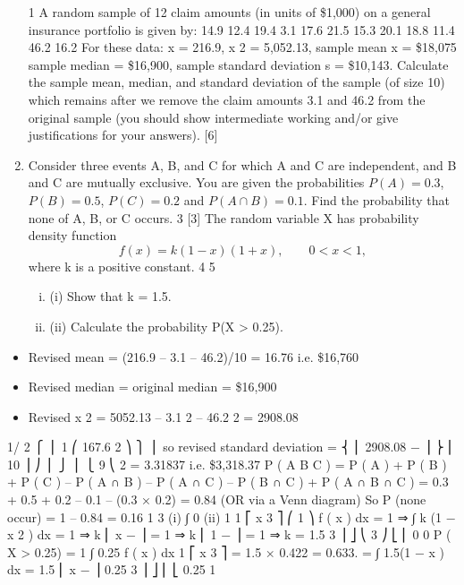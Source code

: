 \documentclass[a4paper,12pt]{article}
\begin{document}
\begin{enumerate}
1
A random sample of 12 claim amounts (in units of \$1,000) on a general insurance
portfolio is given by:
14.9
12.4
19.4
3.1
17.6
21.5
15.3
20.1
18.8
11.4
46.2
16.2
For these data: \sigma x = 216.9, \sigma x 2 = 5,052.13, sample mean x = \$18,075
sample median = \$16,900, sample standard deviation s = \$10,143.
Calculate the sample mean, median, and standard deviation of the sample (of size 10)
which remains after we remove the claim amounts 3.1 and 46.2 from the original
sample (you should show intermediate working and/or give justifications for your answers).
[6]
\item Consider three events A, B, and C for which A and C are independent, and B and C are
mutually exclusive. You are given the probabilities $P(A) = 0.3$, $P(B) = 0.5$, $P(C) = 0.2$
and $P(A\cap B) = 0.1$.
Find the probability that none of A, B, or C occurs.
3
[3]
The random variable X has probability density function
\[f ( x ) = k (1 − x )(1 + x ),
\qquad 0 < x < 1 ,\]
where k is a positive constant.
4
5
\begin{enumerate}[(i)]
\item (i) Show that k = 1.5.
\item (ii) Calculate the probability P(X > 0.25).
\end{enumerate}

\end{enumerate}
\begin{itemize}
\item Revised mean = (216.9 – 3.1 – 46.2)/10 = 16.76 i.e. \$16,760
\item Revised median = original median = \$16,900
\item Revised \sigma x 2 = 5052.13 – 3.1 2 – 46.2 2 = 2908.08
\end{itemize}
1/ 2
⎧ ⎪ 1 ⎛
167.6 2 ⎞ ⎫ ⎪
so revised standard deviation = ⎨ ⎜ 2908.08 −
⎟ ⎬
⎜
10 ⎟ ⎠ ⎪ ⎭
⎪ ⎩ 9 ⎝
2
= 3.31837 i.e. \$3,318.37
P ( A \cup B \cup C ) = P ( A ) + P ( B ) + P ( C ) – P ( A ∩ B ) – P ( A ∩ C ) – P ( B ∩ C ) + P ( A ∩ B ∩ C )
= 0.3 + 0.5 + 0.2 – 0.1 – (0.3 × 0.2) = 0.84
(OR via a Venn diagram)
So P (none occur) = 1 – 0.84 = 0.16
1
3
(i)
∫
0
(ii)
1
1
⎡
x 3 ⎤
⎛ 1 ⎞
f ( x ) dx = 1 ⇒ ∫ k (1 − x 2 ) dx = 1 ⇒ k ⎢ x − ⎥ = 1 ⇒ k ⎜ 1 − ⎟ = 1 ⇒ k = 1.5
3 ⎥ ⎦
⎝ 3 ⎠
⎣ ⎢
0
0
P ( X > 0.25) =
1
∫ 0.25 f ( x ) dx
1
⎡
x 3 ⎤
= 1.5 × 0.422 = 0.633.
= ∫ 1.5(1 − x ) dx = 1.5 ⎢ x − ⎥
0.25
3 ⎥ ⎦
⎢ ⎣
0.25
1
\end{document}
